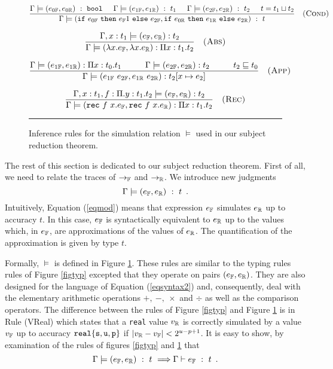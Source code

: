\begin{figure}[tb]
$$
\frac{
\Gamma \models (e_{0\bbf},e_{0\bbr})\ :\ \mathtt{bool}\hspace{0.5cm}\Gamma \models (e_{1\bbf},e_{1\bbr})\ :\ t_1
\hspace{0.5cm} \Gamma \models (e_{2\bbf},e_{2\bbr})\ :\ t_2
\hspace{0.5cm} t=t_1\sqcup t_2}
{\Gamma\models (\mathtt{if}\ e_{0\bbf}\ \mathtt{then}\ e_{\bbf}1\ \mathtt{else}\ e_{2\bbf},
                \mathtt{if}\ e_{0\bbr}\ \mathtt{then}\ e_{1\bbr}\ \mathtt{else}\ e_{2\bbr})\ :\  t}\quad\textsc{(Cond)}
$$

$$
\frac{\Gamma,x :t_1 \models (e_{\mathbb{F}},e_{\mathbb{R}}) :  t_2}
     {\Gamma \models (\lambda x.e_{\mathbb{F}},\lambda x.e_{\mathbb{R}}) : \Pi x:t_1 .  t_2}\quad\textsc{(Abs)}
$$

$$
\frac{\Gamma \models (e_{1\mathbb{F}},e_{1\mathbb{R}}) : \Pi x: t_0. t_1\hspace{1cm} \Gamma \models (e_{2\mathbb{F}},e_{2\mathbb{R}}) :  t_2
\hspace{1cm} t_2\sqsubseteq t_0
}
     {\Gamma \models (e_{1\mathbb{F}}\ e_{2\mathbb{F}},e_{1\mathbb{R}}\ e_{2\mathbb{R}}) :  t_2[x\mapsto e_2]}\quad\textsc{(App)}
$$

$$
\frac{\Gamma,x :t_1,f:\Pi.y:t_1.t_2  \models (e_\bbf,e_\bbr) :  t_2}
     {\Gamma \models (\mathtt{rec}\ f\ x.e_\bbf,\mathtt{rec}\ f\ x.e_\bbr) : \Pi x:t_1 .  t_2}\quad\textsc{(Rec)}
$$
\vspace{0.1cm}
\hrule
\caption{\label{figmod}Inference rules for the simulation relation $\models$ used in our subject reduction theorem.} 
\end{figure}


The rest of this section is dedicated to our subject reduction theorem.
First of all, we need to relate the traces of $\rightarrow_{\mathbb{F}}$ and $\rightarrow_{\mathbb{R}}$.
We introduce new judgments 
\begin{equation}\label{eqmod}
\Gamma \models (e_{\mathbb{F}},e_{\mathbb{R}})\ :\ t\enspace . 
\end{equation}
Intuitively, Equation (\ref{eqmod}) means that  expression $e_{\mathbb{F}}$ simulates 
$e_{\mathbb{R}}$ up to accuracy $t$. In this case, $e_{\mathbb{F}}$
is syntactically equivalent to $e_{\mathbb{R}}$ up to the values which, in $e_{\mathbb{F}}$,
are approximations of the values of $e_{\mathbb{R}}$. The quantification of the approximation
is given by type $t$. 

Formally, $\models$ is defined in Figure \ref{figmod}. These rules are similar to the typing rules
rules of Figure \ref{figtyp} excepted that they operate on pairs $(e_{\mathbb{F}},e_{\mathbb{R}})$.
They are also designed for the language of Equation (\ref{eqsyntax2}) and, consequently,
deal with the elementary arithmetic operations $+,\ -,\ \times$ and $\div$ as well
as the comparison operators. 
The difference between the rules of Figure \ref{figtyp} and Figure \ref{figmod} is
in Rule \textsf{(VReal)} which states that a  \texttt{real} value $v_{\mathbb{R}}$
is correctly simulated by a value $v_{\mathbb{F}}$ up to accuracy $\mathtt{real\{s,u,p\}}$ if
$|v_{\mathbb{R}}-v_{\mathbb{F}}|<2^{u-p+1}$. 
It is easy to show, by examination of the rules of figures \ref{figtyp} and \ref{figmod}
that
\begin{equation}
\Gamma \models (e_\bbf,e_\bbr)\ :\ t\ \Longrightarrow\Gamma \vdash e_\bbf\ :\ t\enspace .
\end{equation}

